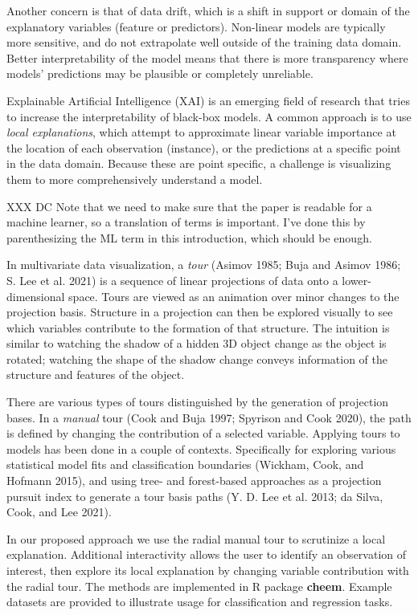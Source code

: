 \documentclass[
]{article}
\begin{document}
Another concern is that of data drift, which is a shift in support or
domain of the explanatory variables (feature or predictors). Non-linear
models are typically more sensitive, and do not extrapolate well outside
of the training data domain. Better interpretability of the model means
that there is more transparency where models' predictions may be
plausible or completely unreliable.

Explainable Artificial Intelligence (XAI) is an emerging field of
research that tries to increase the interpretability of black-box
models. A common approach is to use \emph{local explanations}, which
attempt to approximate linear variable importance at the location of
each observation (instance), or the predictions at a specific point in
the data domain. Because these are point specific, a challenge is
visualizing them to more comprehensively understand a model.

XXX DC Note that we need to make sure that the paper is readable for a
machine learner, so a translation of terms is important. I've done this
by parenthesizing the ML term in this introduction, which should be
enough.

In multivariate data visualization, a \emph{tour} (Asimov 1985; Buja and
Asimov 1986; S. Lee et al. 2021) is a sequence of linear projections of
data onto a lower-dimensional space. Tours are viewed as an animation
over minor changes to the projection basis. Structure in a projection
can then be explored visually to see which variables contribute to the
formation of that structure. The intuition is similar to watching the
shadow of a hidden 3D object change as the object is rotated; watching
the shape of the shadow change conveys information of the structure and
features of the object.

There are various types of tours distinguished by the generation of
projection bases. In a \emph{manual} tour (Cook and Buja 1997; Spyrison
and Cook 2020), the path is defined by changing the contribution of a
selected variable. Applying tours to models has been done in a couple of
contexts. Specifically for exploring various statistical model fits and
classification boundaries (Wickham, Cook, and Hofmann 2015), and using
tree- and forest-based approaches as a projection pursuit index to
generate a tour basis paths (Y. D. Lee et al. 2013; da Silva, Cook, and
Lee 2021).

In our proposed approach we use the radial manual tour to scrutinize a
local explanation. Additional interactivity allows the user to identify
an observation of interest, then explore its local explanation by
changing variable contribution with the radial tour. The methods are
implemented in R package \textbf{cheem}. Example datasets are provided
to illustrate usage for classification and regression tasks.
\end{document}
